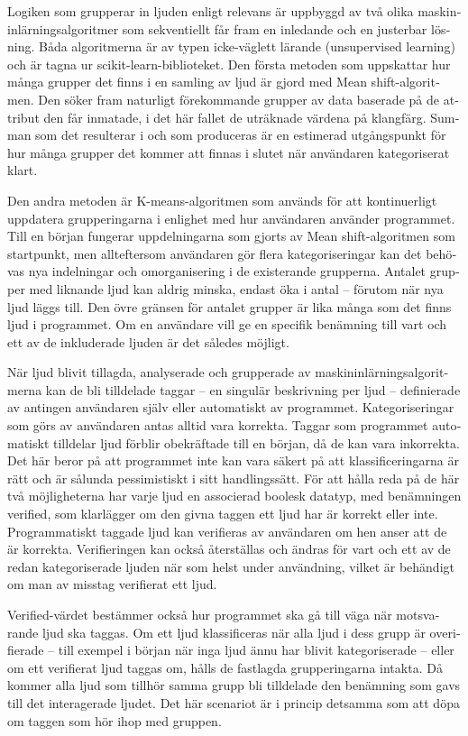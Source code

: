 \begin{otherlanguage}{swedish}
    Logiken som grupperar in ljuden enligt relevans är uppbyggd av två olika maskininlärningsalgoritmer som sekventiellt får fram en inledande och en justerbar lösning. Båda algoritmerna är av typen icke-väglett lärande (unsupervised learning) och är tagna ur scikit-learn-biblioteket. Den första metoden som uppskattar hur många grupper det finns i en samling av ljud är gjord med Mean shift-algoritmen. Den söker fram naturligt förekommande grupper av data baserade på de attribut den får inmatade, i det här fallet de uträknade värdena på klangfärg. Summan som det resulterar i och som produceras är en estimerad utgångspunkt för hur många grupper det kommer att finnas i slutet när användaren kategoriserat klart.

    Den andra metoden är K-means-algoritmen som används för att kontinuerligt uppdatera grupperingarna i enlighet med hur användaren använder programmet. Till en början fungerar uppdelningarna som gjorts av Mean shift-algoritmen som startpunkt, men allteftersom användaren gör flera kategoriseringar kan det behövas nya indelningar och omorganisering i de existerande grupperna. Antalet grupper med liknande ljud kan aldrig minska, endast öka i antal – förutom när nya ljud läggs till. Den övre gränsen för antalet grupper är lika många som det finns ljud i programmet. Om en användare vill ge en specifik benämning till vart och ett av de inkluderade ljuden är det således möjligt.

    När ljud blivit tillagda, analyserade och grupperade av maskininlärningsalgoritmerna kan de bli tilldelade taggar – en singulär beskrivning per ljud – definierade av antingen användaren själv eller automatiskt av programmet. Kategoriseringar som görs av användaren antas alltid vara korrekta. Taggar som programmet automatiskt tilldelar ljud förblir obekräftade till en början, då de kan vara inkorrekta. Det här beror på att programmet inte kan vara säkert på att klassificeringarna är rätt och är sålunda pessimistiskt i sitt handlingssätt. För att hålla reda på de här två möjligheterna har varje ljud en associerad boolesk datatyp, med benämningen verified, som klarlägger om den givna taggen ett ljud har är korrekt eller inte. Programmatiskt taggade ljud kan verifieras av användaren om hen anser att de är korrekta. Verifieringen kan också återställas och ändras för vart och ett av de redan kategoriserade ljuden när som helst under användning, vilket är behändigt om man av misstag verifierat ett ljud.

    Verified-värdet bestämmer också hur programmet ska gå till väga när motsvarande ljud ska taggas. Om ett ljud klassificeras när alla ljud i dess grupp är overifierade – till exempel i början när inga ljud ännu har blivit kategoriserade – eller om ett verifierat ljud taggas om, hålls de fastlagda grupperingarna intakta. Då kommer alla ljud som tillhör samma grupp bli tilldelade den benämning som gavs till det interagerade ljudet. Det här scenariot är i princip detsamma som att döpa om taggen som hör ihop med gruppen.


\end{otherlanguage}

